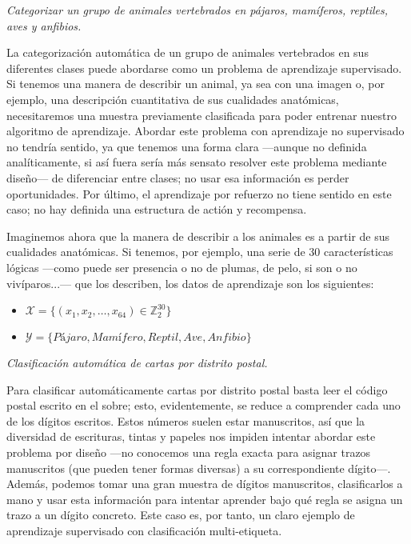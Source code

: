\documentclass[a4paper, 11pt]{article}
\begin{document}
    \begin{solucion}
        \emph{Categorizar un grupo de animales vertebrados en pájaros, mamíferos, reptiles, aves y anfibios.}

        La categorización automática de un grupo de animales vertebrados en sus diferentes clases puede abordarse como un problema de aprendizaje supervisado. Si tenemos una manera de describir un animal, ya sea con una imagen o, por ejemplo, una descripción cuantitativa de sus cualidades anatómicas, necesitaremos una muestra previamente clasificada para poder entrenar nuestro algoritmo de aprendizaje. Abordar este problema con aprendizaje no supervisado no tendría sentido, ya que tenemos una forma clara ---aunque no definida analíticamente, si así fuera sería más sensato resolver este problema mediante diseño--- de diferenciar entre clases; no usar esa información es perder oportunidades. Por último, el aprendizaje por refuerzo no tiene sentido en este caso; no hay definida una estructura de actión y recompensa.

        Imaginemos ahora que la manera de describir a los animales es a partir de sus cualidades anatómicas. Si tenemos, por ejemplo, una serie de 30 características lógicas ---como puede ser presencia o no de plumas, de pelo, si son o no vivíparos...--- que los describen, los datos de aprendizaje son los siguientes:
        \begin{itemize}
            \item $\mathcal{X} = \{(x_1, x_2, \dots, x_{64}) \in \mathbb{Z}_2^{30}\}$
            \item $\mathcal{Y} = \{Pájaro, Mamífero, Reptil, Ave, Anfibio\}$
        \end{itemize}

        \emph{Clasificación automática de cartas por distrito postal.}

        Para clasificar automáticamente cartas por distrito postal basta leer el código postal escrito en el sobre; esto, evidentemente, se reduce a comprender cada uno de los dígitos escritos.  Estos números suelen estar manuscritos, así que la diversidad de escrituras, tintas y papeles nos impiden intentar abordar este problema por diseño ---no conocemos una regla exacta para asignar trazos manuscritos (que pueden tener formas diversas) a su correspondiente dígito---. Además, podemos tomar una gran muestra de dígitos manuscritos, clasificarlos a mano y usar esta información para intentar aprender bajo qué regla se asigna un trazo a un dígito concreto. Este caso es, por tanto, un claro ejemplo de aprendizaje supervisado con clasificación multi-etiqueta.


\end{solucion}
\end{document}
